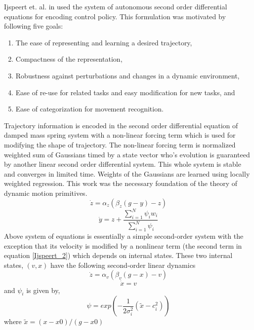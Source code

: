 Ijspeert et. al. in \cite{ijspeert2002movement} used the system of autonomous second order differential equations for encoding control policy. This formulation was motivated by following five goals:
\begin{enumerate}
	\item The ease of representing and learning a desired trajectory, 
	\item Compactness of the representation, 
	\item Robustness against perturbations and changes in a dynamic environment, 
	\item Ease of re-use for related tasks and easy modification for new tasks, and 
	\item Ease of categorization for movement recognition.
\end{enumerate}
Trajectory information is encoded in the second order differential equation of damped mass spring system with a non-linear forcing term which is used for modifying the shape of trajectory. The non-linear forcing term is normalized weighted sum of Gaussians timed by a state vector who's evolution is guaranteed by another linear second order differential system. This whole system is stable and converges in limited time. Weights of the Gaussians are learned using locally weighted regression. This work was the necessary foundation of the theory of dynamic motion primitives. 
\begin{equation} \label{Ijspeert_1}
	\dot{z} = \alpha_{z}(\beta_{z}(g - y) - z)
\end{equation}
\begin{equation} \label{Ijspeert_2}
	\dot{y} = z + \frac{\sum_{i=1}^{N}\psi_{i}w_{i}}{\sum_{i=1}^{N}\psi_{i}}
\end{equation}
Above system of equations is essentially a simple second-order system with the exception that its velocity is modified by a nonlinear term (the second term in equation \ref{Ijspeert_2}) which depends on internal states. These two internal states, $(v,x)$ have the following second-order linear dynamics
\begin{equation}
\dot{z} = \alpha_{v}(\beta_{v}(g - x) - v)
\end{equation}
\begin{equation}
\dot{x} = v
\end{equation}
and $\psi_{i}$ is given by,
\begin{equation}
\psi = exp(-\frac{1}{2\sigma_{i}^{2}}(\tilde{x} - c_{i}^{2}))
\end{equation}
where $\tilde{x} = (x - x0)/(g - x0)$


